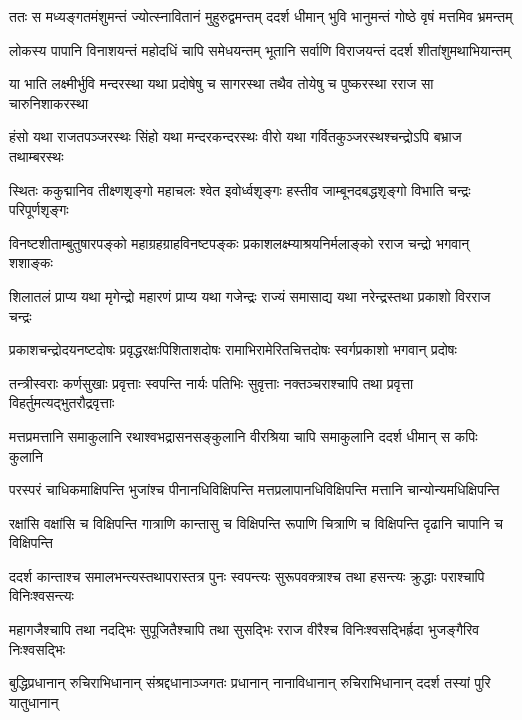 
\twolineshloka
{ततः स मध्यङ्गतमंशुमन्तं ज्योत्स्नावितानं मुहुरुद्वमन्तम्}
{ददर्श धीमान् भुवि भानुमन्तं गोष्ठे वृषं मत्तमिव भ्रमन्तम्} %

\twolineshloka
{लोकस्य पापानि विनाशयन्तं महोदधिं चापि समेधयन्तम्}
{भूतानि सर्वाणि विराजयन्तं ददर्श शीतांशुमथाभियान्तम्} %

\twolineshloka
{या भाति लक्ष्मीर्भुवि मन्दरस्था यथा प्रदोषेषु च सागरस्था}
{तथैव तोयेषु च पुष्करस्था रराज सा चारुनिशाकरस्था} %

\twolineshloka
{हंसो यथा राजतपञ्जरस्थः सिंहो यथा मन्दरकन्दरस्थः}
{वीरो यथा गर्वितकुञ्जरस्थश्चन्द्रोऽपि बभ्राज तथाम्बरस्थः} %

\twolineshloka
{स्थितः ककुद्मानिव तीक्ष्णशृङ्गो महाचलः श्वेत इवोर्ध्वशृङ्गः}
{हस्तीव जाम्बूनदबद्धशृङ्गो विभाति चन्द्रः परिपूर्णशृङ्गः} %

\twolineshloka
{विनष्टशीताम्बुतुषारपङ्को महाग्रहग्राहविनष्टपङ्कः}
{प्रकाशलक्ष्म्याश्रयनिर्मलाङ्को रराज चन्द्रो भगवान् शशाङ्कः} %

\twolineshloka
{शिलातलं प्राप्य यथा मृगेन्द्रो महारणं प्राप्य यथा गजेन्द्रः}
{राज्यं समासाद्य यथा नरेन्द्रस्तथा प्रकाशो विरराज चन्द्रः} %

\twolineshloka
{प्रकाशचन्द्रोदयनष्टदोषः प्रवृद्धरक्षःपिशिताशदोषः}
{रामाभिरामेरितचित्तदोषः स्वर्गप्रकाशो भगवान् प्रदोषः} %

\twolineshloka
{तन्त्रीस्वराः कर्णसुखाः प्रवृत्ताः स्वपन्ति नार्यः पतिभिः सुवृत्ताः}
{नक्तञ्चराश्चापि तथा प्रवृत्ता विहर्तुमत्यद्भुतरौद्रवृत्ताः} %

\twolineshloka
{मत्तप्रमत्तानि समाकुलानि रथाश्वभद्रासनसङ्कुलानि}
{वीरश्रिया चापि समाकुलानि ददर्श धीमान् स कपिः कुलानि} %

\twolineshloka
{परस्परं चाधिकमाक्षिपन्ति भुजांश्च पीनानधिविक्षिपन्ति}
{मत्तप्रलापानधिविक्षिपन्ति मत्तानि चान्योन्यमधिक्षिपन्ति} %

\twolineshloka
{रक्षांसि वक्षांसि च विक्षिपन्ति गात्राणि कान्तासु च विक्षिपन्ति}
{रूपाणि चित्राणि च विक्षिपन्ति दृढानि चापानि च विक्षिपन्ति} %

\twolineshloka
{ददर्श कान्ताश्च समालभन्त्यस्तथापरास्तत्र पुनः स्वपन्त्यः}
{सुरूपवक्त्राश्च तथा हसन्त्यः क्रुद्धाः पराश्चापि विनिःश्वसन्त्यः} %

\twolineshloka
{महागजैश्चापि तथा नदद्भिः सुपूजितैश्चापि तथा सुसद्भिः}
{रराज वीरैश्च विनिःश्वसद्भिर्ह्रदा भुजङ्गैरिव निःश्वसद्भिः} %

\twolineshloka
{बुद्धिप्रधानान् रुचिराभिधानान् संश्रद्दधानाञ्जगतः प्रधानान्}
{नानाविधानान् रुचिराभिधानान् ददर्श तस्यां पुरि यातुधानान्} %

